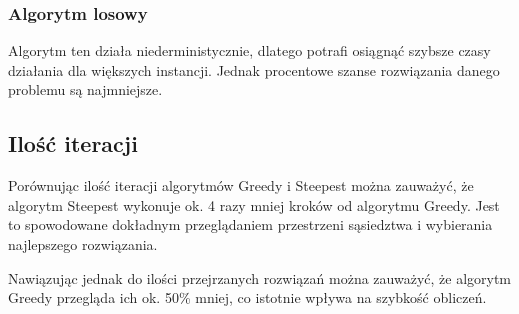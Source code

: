 \subsubsection{Algorytm losowy}

Algorytm ten działa niederministycznie, dlatego potrafi osiągnąć szybsze czasy działania dla 
większych instancji. Jednak procentowe szanse rozwiązania danego problemu są najmniejsze.

\subsection{Ilość iteracji}

Porównując ilość iteracji algorytmów Greedy i Steepest można zauważyć, że algorytm 
Steepest wykonuje ok. 4 razy mniej kroków od algorytmu Greedy. Jest to spowodowane 
dokładnym przeglądaniem przestrzeni sąsiedztwa i wybierania najlepszego rozwiązania.

Nawiązując jednak do ilości przejrzanych rozwiązań można zauważyć, że algorytm
Greedy przegląda ich ok. 50\% mniej, co istotnie wpływa na szybkość obliczeń.
